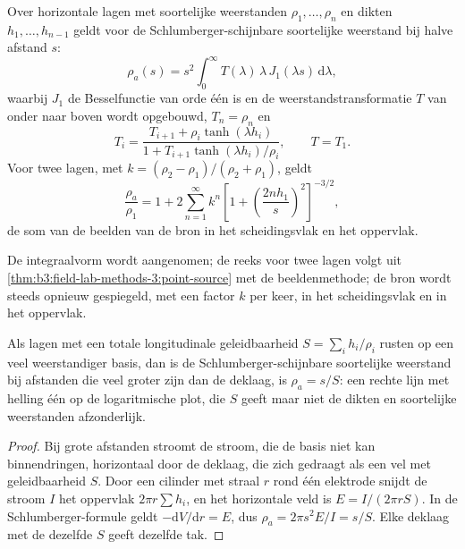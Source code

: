 \begin{proposition}\label{prop:b3:field-lab-methods-3:layers}
Over horizontale lagen met soortelijke weerstanden $\rho_1, \dots, \rho_n$ en
dikten $h_1, \dots, h_{n-1}$ geldt voor de Schlumberger-schijnbare
soortelijke weerstand bij halve afstand $s$:
\[
\rho_a(s) = s^2\int_0^\infty T(\lambda)\,\lambda\,J_1(\lambda s)\,\mathrm{d}\lambda ,
\]
waarbij $J_1$ de Besselfunctie van orde één is en de weerstandstransformatie $T$ van
onder naar boven wordt opgebouwd, $T_n = \rho_n$ en
\[
T_i = \frac{T_{i+1} + \rho_i\tanh(\lambda h_i)}{1 + T_{i+1}\tanh(\lambda h_i)/\rho_i} ,
\qquad T = T_1 .
\]
Voor twee lagen, met $k = (\rho_2 - \rho_1)/(\rho_2 + \rho_1)$, geldt
\[
\frac{\rho_a}{\rho_1} = 1 + 2\sum_{n=1}^{\infty} k^n
  \left[1 + \left(\frac{2nh_1}{s}\right)^2\right]^{-3/2} ,
\]
de som van de beelden van de bron in het scheidingsvlak en het oppervlak.
\end{proposition}
De integraalvorm wordt aangenomen; de reeks voor twee lagen volgt uit
\cref{thm:b3:field-lab-methods-3:point-source} met de beeldenmethode;
de bron wordt steeds opnieuw gespiegeld, met een factor $k$ per keer, in
het scheidingsvlak en in het oppervlak.

\begin{proposition}\label{prop:b3:field-lab-methods-3:conductance}
Als lagen met een totale longitudinale geleidbaarheid $S = \sum_i h_i/\rho_i$ rusten
op een veel weerstandiger basis, dan is de Schlumberger-schijnbare soortelijke weerstand bij
afstanden die veel groter zijn dan de deklaag, is $\rho_a = s/S$: een rechte lijn met
helling één op de logaritmische plot, die $S$ geeft maar niet de dikten en
soortelijke weerstanden afzonderlijk.
\end{proposition}

\begin{proof}
Bij grote afstanden stroomt de stroom, die de basis niet kan binnendringen,
horizontaal door de deklaag, die zich gedraagt als een vel met
geleidbaarheid $S$. Door een cilinder met straal $r$ rond één elektrode
snijdt de stroom $I$ het oppervlak $2\pi r\sum h_i$, en het horizontale
veld is $E = I/(2\pi rS)$. In de Schlumberger-formule geldt $-\mathrm{d}V/
\mathrm{d}r = E$, dus $\rho_a = 2\pi s^2 E/I = s/S$. Elke deklaag met de
dezelfde $S$ geeft dezelfde tak.
\end{proof}

